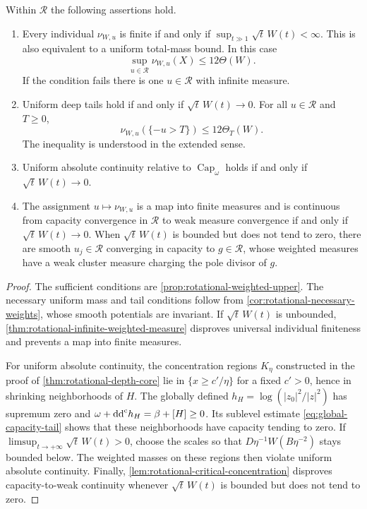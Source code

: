 \begin{theorem}\label{thm:rotational-sharp-damping}
Within $\mathcal R$ the following assertions hold.
\begin{enumerate}
\item Every individual $\nu_{W,u}$ is finite if and only if
$\sup_{t\gg1}\sqrt t\,W(t)<\infty$. This is also equivalent to a uniform
total-mass bound. In this case
\[
 \sup_{u\in\mathcal R}\nu_{W,u}(X)\leq12\Theta(W).
\]
If the condition fails there is one $u\in\mathcal R$ with infinite measure.
\item Uniform deep tails hold if and only if $\sqrt t\,W(t)\to0$.
For all $u\in\mathcal R$ and $T\geq0$,
\[
 \nu_{W,u}(\{-u>T\})\leq12\Theta_T(W).
\]
The inequality is understood in the extended sense.
\item Uniform absolute continuity relative to $\operatorname{Cap}_\omega$
holds if and only if $\sqrt t\,W(t)\to0$.
\item The assignment $u\mapsto\nu_{W,u}$ is a map into finite measures
and is continuous from capacity convergence in $\mathcal R$ to weak
measure convergence if and only if $\sqrt t\,W(t)\to0$.
When $\sqrt t\,W(t)$ is bounded but does not tend to zero, there are
smooth $u_j\in\mathcal R$ converging in capacity to
$g\in\mathcal R$, whose weighted measures have a weak cluster measure
charging the pole divisor of $g$.
\end{enumerate}
\end{theorem}
\begin{proof}
The sufficient conditions are \cref{prop:rotational-weighted-upper}. The necessary uniform mass and tail conditions follow from \cref{cor:rotational-necessary-weights}, whose smooth potentials are invariant. If $\sqrt t\,W(t)$ is unbounded, \cref{thm:rotational-infinite-weighted-measure} disproves universal individual finiteness and prevents a map into finite measures.

For uniform absolute continuity, the concentration regions $K_\eta$ constructed in the proof of \cref{thm:rotational-depth-core} lie in $\{x\geq c'/\eta\}$ for a fixed $c'>0$, hence in shrinking neighborhoods of $H$. The globally defined $h_H=\log(|z_0|^2/|z|^2)$ has supremum zero and $\omega+\mathrm{dd}^{\mathrm{c}} h_H=\beta+[H]\geq0$. Its sublevel estimate \eqref{eq:global-capacity-tail} shows that these neighborhoods have capacity tending to zero. If $\limsup_{t\to+\infty}\sqrt t\,W(t)>0$, choose the scales so that $D\eta^{-1}W(B\eta^{-2})$ stays bounded below. The weighted masses on these regions then violate uniform absolute continuity. Finally, \cref{lem:rotational-critical-concentration} disproves capacity-to-weak continuity whenever $\sqrt t\,W(t)$ is bounded but does not tend to zero.
\end{proof}


